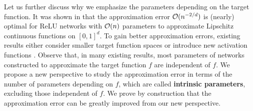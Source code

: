 \documentclass[nohyperref]{article}
\theoremstyle{plain}
\theoremstyle{definition}
\theoremstyle{remark}
\begin{document}
%
% 
%
%
%


Let us further discuss why we emphasize the parameters depending on the target function.
It was shown in \cite{yarotsky18a,shijun2,shijun:thesis,shijun6} that the approximation error ${\mathcal{O}}(n^{-2/d})$ is (nearly) optimal for ReLU networks with ${\mathcal{O}}(n)$ parameters to approximate Lipschitz continuous functions on $[0,1]^d$. To gain better approximation errors, existing results either consider smaller target function spaces  \cite{yarotsky:2019:06,yarotsky2017,shijun3,barron1993,Weinan2019,doi:10.1002/mma.5575,bandlimit} or introduce new activation functions  \cite{shijun4,shijun7,shijun5,pmlr-v139-yarotsky21a}. 
Observe that, in many existing results, most parameters of networks constructed to approximate the target function $f$ are independent of $f$.
We propose a new perspective to study the approximation error in terms of the number of parameters depending on $f$, which are called \textbf{intrinsic parameters}, excluding those independent of $f$. We prove by construction that the approximation error can be greatly improved from our new perspective.
\end{document}

